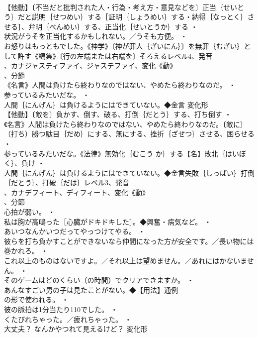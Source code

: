 \documentclass[8pt]{extreport}
\begin{document}
\begin{CJK}{UTF8}{min}
\\	【他動】〔不当だと批判された人・行為・考え方・意見などを〕正当｛せいとう｝だと説明｛せつめい｝する［証明｛しょうめい｝する・納得｛なっとく｝させる］、弁明｛べんめい｝する、正当化｛せいとうか｝する ・
\\	状況がうそを正当化するかもしれない。／うそも方便。 ・
\\	お怒りはもっともでした。《神学》〔神が罪人｛ざいにん｝〕を無罪｛むざい｝として許す《編集》〔行の左端または右端を〕そろえるレベル4、発音
\\	、カナジャスティファイ、ジャステファイ、変化《動》
\\	、分節
\\	《名言》人間は負けたら終わりなのではない、やめたら終わりなのだ。 ・
\\	参っているみたいだな。 ・
\\	人間｛にんげん｝は負けるようにはできていない。◆金言	変化形 
\\	【他動】〔敵を〕負かす、倒す、破る、打倒｛だとう｝する、打ち倒す ・
\\	《名言》人間は負けたら終わりなのではない、やめたら終わりなのだ。〔敵に〕（打ち）勝つ駄目｛だめ｝にする、無にする、挫折｛ざせつ｝させる、困らせる ・
\\	参っているみたいだな。《法律》無効化｛むこう か｝する【名】敗北｛はいぼく｝、負け ・
\\	人間｛にんげん｝は負けるようにはできていない。◆金言失敗｛しっぱい｝打倒｛だとう｝、打破｛だは｝レベル3、発音
\\	、カナデフィート、ディフィート、変化《動》
\\	、分節
\\	心拍が弱い。 ・
\\	私は胸が高鳴った［心臓がドキドキした］。◆興奮・病気など。 ・
\\	あいつなんかいつだってやっつけてやる。 ・
\\	彼らを打ち負かすことができないなら仲間になった方が安全です。／長い物には巻かれろ。 ・
\\	これ以上のものはないですよ。／それ以上は望めません。／あれにはかないません。 ・
\\	そのゲームはどのくらい（の時間）でクリアできますか。 ・
\\	あんなすごい男の子は見たことがない。◆【用法】通例
\\	の形で使われる。 ・
\\	彼の脈拍は1分当たり110でした。 ・
\\	くたびれちゃった。／疲れちゃった。 ・
\\	大丈夫？ なんかやつれて見えるけど？	変化形 

\end{CJK}
\end{document}
